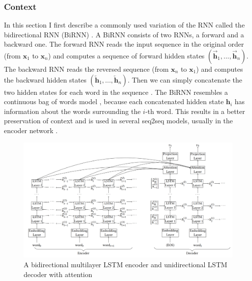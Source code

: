\documentclass[12pt]{article}
\begin{document}
\subsubsection{Context} \label{sssec:context}
In this section I first describe a commonly used variation of the RNN called the bidirectional RNN (BiRNN) \cite{Schuster:1997}. A BiRNN consists of two RNNs, a forward and a backward one. The forward RNN reads the input sequence in the original order (from \(\bm{x}_1\) to \(\bm{x}_n\)) and computes a sequence of forward hidden states \((\overrightarrow{\bm{h}}_1,...,\overrightarrow{\bm{h}}_n)\). The backward RNN reads the reversed sequence (from \(\bm{x}_n\) to \(\bm{x}_1\)) and computes the backward hidden states \((\overleftarrow{\bm{h}}_1,...,\overleftarrow{\bm{h}}_n)\). Then we can simply concatenate the two hidden states for each word in the sequence \cite{Bahdanau:2014,Zhaob:2017}. The BiRNN resembles a continuous bag of words model \cite{Mikolov:2013}, because each concatenated hidden state \(\bm{h}_i\) has information about the words surrounding the \(i\)-th word. This results in a better preservation of context and is used in several seq2seq models, usually in the encoder network \cite{Zhaob:2017,Xing_topic:2017,googleNMT:2016,Yin:2017}.
\begin{figure}[H]
	\centering
	\includegraphics[width=1.0\textwidth]{pics/bilstm.png}
	\caption{A bidirectional multilayer LSTM encoder and unidirectional LSTM decoder with attention \cite{Yin:2017}}
	\label{fig:context}
\end{figure}
\end{document}
